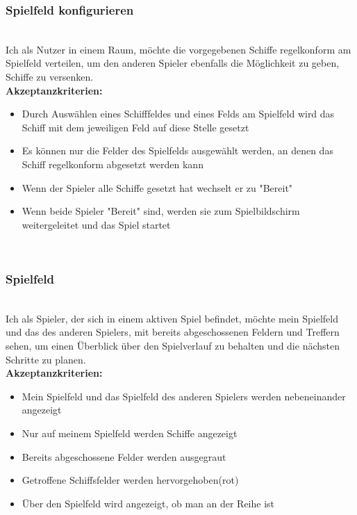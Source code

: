 \documentclass[conference]{IEEEtran}
\begin{document}
    \subsubsection{Spielfeld konfigurieren}
    \ \\
    Ich als Nutzer in einem Raum, möchte die vorgegebenen Schiffe regelkonform am Spielfeld verteilen, um den anderen Spieler ebenfalls die Möglichkeit zu geben, Schiffe zu versenken. \\
    \textbf{Akzeptanzkriterien:}
    \begin{itemize}
        \item Durch Auswählen eines Schifffeldes und eines Felds am Spielfeld wird das Schiff mit dem jeweiligen Feld auf diese Stelle gesetzt
        \item Es können nur die Felder des Spielfelds ausgewählt werden, an denen das Schiff regelkonform abgesetzt werden kann
        \item Wenn der Spieler alle Schiffe gesetzt hat wechselt er zu "Bereit"
        \item Wenn beide Spieler "Bereit" sind, werden sie zum Spielbildschirm weitergeleitet und das Spiel startet
    \end{itemize}
    \ \\
    \subsubsection{Spielfeld}
    \ \\
    Ich als Spieler, der sich in einem aktiven Spiel befindet, möchte mein Spielfeld und das des anderen Spielers, mit bereits abgeschossenen Feldern und Treffern sehen, um einen Überblick über den Spielverlauf zu behalten und die nächsten Schritte zu planen. \\
    \textbf{Akzeptanzkriterien:}
    \begin{itemize}
        \item Mein Spielfeld und das Spielfeld des anderen Spielers werden nebeneinander angezeigt
        \item Nur auf meinem Spielfeld werden Schiffe angezeigt
        \item Bereits abgeschossene Felder werden ausgegraut
        \item Getroffene Schiffsfelder werden hervorgehoben(rot)
        \item Über den Spielfeld wird angezeigt, ob man an der Reihe ist
    \end{itemize}
    \ \\
\end{document}
